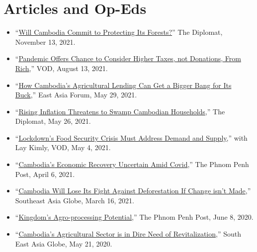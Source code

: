 \documentclass[10pt,a4paper]{article}
\begin{document}
\section*{Articles and Op-Eds}
	\vspace{-1em}
	\begin{adjustwidth}{.7cm}{}
		\begin{itemize}[label={},itemindent=-2em,leftmargin=2em]
			
			\item ``\href{https://thediplomat.com/2021/11/will-cambodia-commit-to-protecting-its-forests/}{Will Cambodia Commit to Protecting Its Forests?}'' The Diplomat, November 13, 2021.
						
			\item ``\href{https://vodenglish.news/opinion-pandemic-offers-chance-to-consider-higher-taxes-not-donations-from-rich/}{Pandemic Offers Chance to Consider Higher Taxes, not Donations, From Rich},'' VOD, August 13, 2021.
				
			\item ``\href{https://www.eastasiaforum.org/2021/05/29/how-cambodias-agricultural-lending-can-get-a-bigger-bang-for-its-buck/}{How Cambodia's Agricultural Lending Can Get a Bigger Bang for Its Buck},'' East Asia Forum, May 29, 2021.
				
			\item ``\href{https://thediplomat.com/2021/05/rising-inflation-threatens-to-swamp-cambodian-households/}{Rising Inflation Threatens to Swamp Cambodian Households},'' The Diplomat, May 26, 2021.
				
			\item ``\href{https://vodenglish.news/opinion-lockdowns-food-security-crisis-must-address-demand-and-supply/}{Lockdown's Food Security Crisis Must Address Demand and Supply},'' with Lay Kimly, VOD, May 4, 2021.
			
			\item “\href{https://www.phnompenhpost.com/opinion/cambodias-economic-recovery-uncertain-amid-covid}{Cambodia's Economic Recovery Uncertain Amid Covid},” The Phnom Penh Post, April 6, 2021. 
				
			\item “\href{https://southeastasiaglobe.com/cambodia-deforestation-fight/}{Cambodia Will Lose Its Fight Against Deforestation If Change isn't Made},” Southeast Asia Globe, March 16, 2021.
			
			\item “\href{https://www.phnompenhpost.com/opinion/kingdoms-agro-processing-potential}{Kingdom’s Agro-processing Potential},” The Phnom Penh Post, June 8, 2020. 
			
			\item “\href{https://southeastasiaglobe.com/cambodias-agricultural-sector-is-one-in-dire-need-of-revitalising}{Cambodia’s Agricultural Sector is in Dire Need of Revitalization},” South East Asia Globe, May 21, 2020. 
				
				
		\end{itemize}
	\end{adjustwidth}			
	\vspace{-1em}
\end{document}
